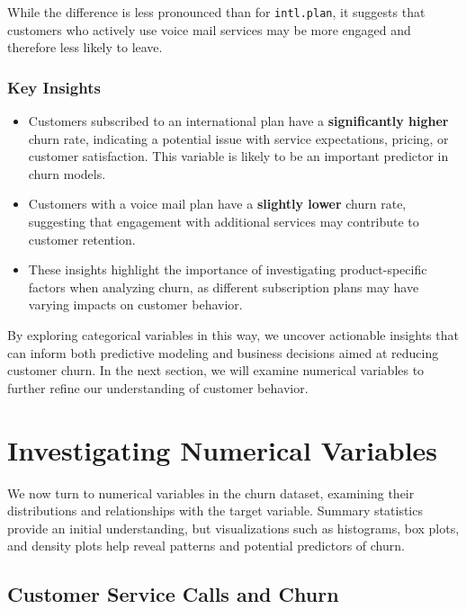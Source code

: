 \documentclass[
  11pt,
]{book}
\providecommand{\tightlist}{%
  \setlength{\itemsep}{0pt}\setlength{\parskip}{0pt}}
\theoremstyle{definition}
\theoremstyle{definition}
\theoremstyle{definition}
\theoremstyle{definition}
\theoremstyle{remark}
\begin{document}
While the difference is less pronounced than for \texttt{intl.plan}, it suggests that customers who actively use voice mail services may be more engaged and therefore less likely to leave.

\subsubsection*{Key Insights}\label{key-insights}


\begin{itemize}
\tightlist
\item
  Customers subscribed to an international plan have a \textbf{significantly higher} churn rate, indicating a potential issue with service expectations, pricing, or customer satisfaction. This variable is likely to be an important predictor in churn models.
\item
  Customers with a voice mail plan have a \textbf{slightly lower} churn rate, suggesting that engagement with additional services may contribute to customer retention.
\item
  These insights highlight the importance of investigating product-specific factors when analyzing churn, as different subscription plans may have varying impacts on customer behavior.
\end{itemize}

By exploring categorical variables in this way, we uncover actionable insights that can inform both predictive modeling and business decisions aimed at reducing customer churn. In the next section, we will examine numerical variables to further refine our understanding of customer behavior.

\section{Investigating Numerical Variables}\label{EDA-sec-numeric}

We now turn to numerical variables in the churn dataset, examining their distributions and relationships with the target variable. Summary statistics provide an initial understanding, but visualizations such as histograms, box plots, and density plots help reveal patterns and potential predictors of churn.

\subsection*{Customer Service Calls and Churn}\label{customer-service-calls-and-churn}
\end{document}
